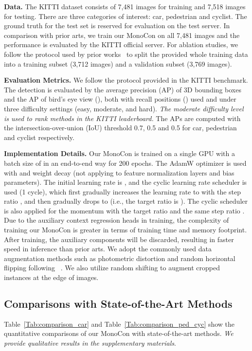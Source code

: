 \documentclass[letterpaper]{article} \usepackage{aaai22}  \usepackage{times}  \usepackage{helvet}  \usepackage{courier}  \usepackage[hyphens]{url}  \usepackage{graphicx} \urlstyle{rm} \def\UrlFont{\rm}  \usepackage{natbib}  \usepackage{caption} \DeclareCaptionStyle{ruled}{labelfont=normalfont,labelsep=colon,strut=off} \frenchspacing  \setlength{\pdfpagewidth}{8.5in}  \setlength{\pdfpageheight}{11in}  \usepackage{algorithm}
\begin{document}
\textbf{Data.}  The KITTI dataset consists of 7,481 images for training and 7,518 images for testing. There are three categories of interest: car, pedestrian and cyclist.   The ground truth for the test set is reserved for evaluation on the test server.  In comparison with prior arts, we train our MonoCon on all 7,481 images and the performance is evaluated by the KITTI official server.  For ablation studies, we follow the protocol used by prior works~\cite{mono3d, chen2, multiview} to split the provided whole training data into a training subset (3,712 images) and a validation subset (3,769 images).  

\textbf{Evaluation Metrics.}  We follow the protocol provided in the KITTI benchmark.  The detection is evaluated by the average precision (AP) of 3D bounding boxes  and the AP of bird's eye view (), both with  recall positions () used and under three difficulty settings (easy, moderate, and hard).\textit{ The moderate difficulty level is used to rank methods in the KITTI leaderboard.} The APs are computed with the intersection-over-union (IoU) threshold 0.7, 0.5 and 0.5 for car, pedestrian and cyclist respectively. 

\textbf{Implementation Details.} Our MonoCon is trained on a single GPU with a batch size of  in an end-to-end way for 200 epochs. The AdamW optimizer is used with  and weight decay  (not applying to feature normalization layers and bias parameters). The initial learning rate is , and the cyclic learning rate scheduler is used (1 cycle), which first gradually increases the learning rate to  with the step ratio , and then gradually drops to  (i.e., the target ratio is ). The cyclic scheduler is also applied for the momentum with the target ratio  and the same step ratio . Due to the auxiliary context regression heads in training, the complexity of training our MonoCon is greater in terms of training time and memory footprint. After training, the auxiliary components will be discarded, resulting in faster speed in inference than prior arts. {We adopt the commonly used data augmentation methods such as photometric distortion and random horizontal flipping following ~\cite{centernet, monodle, monoflex}. We also utilize random shifting to augment cropped instances at the edge of images.}




\subsection{Comparisons with State-of-the-Art Methods}
Table~\ref{Tab:comparison_car} and Table~\ref{Tab:comparison_ped_cyc} show the quantitative comparisons of our MonoCon with state-of-the-art methods. \textit{We provide qualitative results in the supplementary materials}.
\end{document}
